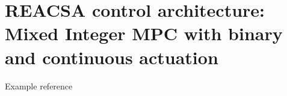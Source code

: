 \chapter{REACSA control architecture: Mixed Integer MPC with binary and continuous actuation }
Example reference \cite{notarstefano2011containment}
